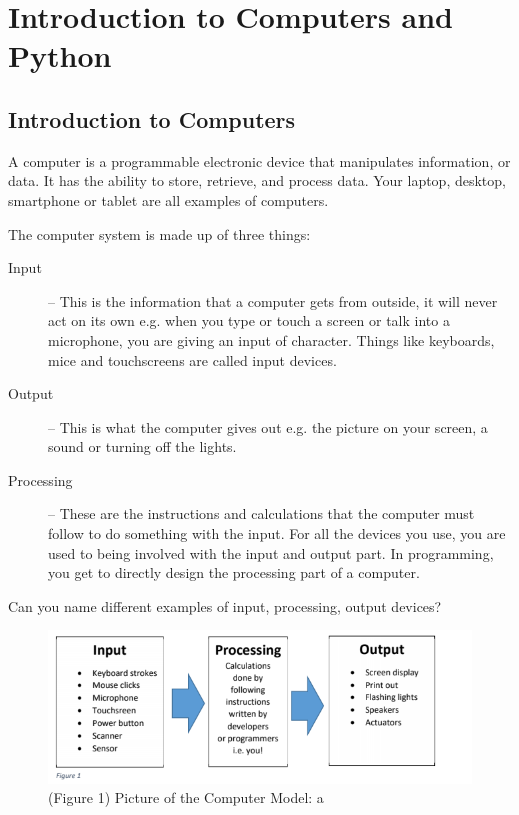 
\chapter{Introduction to Computers and Python}

\section{Introduction to Computers}

A computer is a programmable electronic device that manipulates information, or data. It has the ability to store, retrieve, and process data. Your laptop, desktop, smartphone or tablet are all examples of computers.

\noindent The computer system is made up of three things:
\begin{description}
\item[Input] – This is the information that a computer gets from outside, it will never act on its
own e.g. when you type or touch a screen or talk into a microphone, you are giving an input of character. Things like keyboards, mice and touchscreens are called input devices.\\
\item[Output] – This is what the computer gives out e.g. the picture on your screen, a sound or turning off the lights.\\
\item[Processing] – These are the instructions and calculations that the computer must follow to do something with the input. For all the devices you use, you are used to being 
involved with the input and output part. In programming, you get to directly design
the processing part of a computer.\\
\end{description}

\begin{problem}
Can you name different examples of input, processing, output devices?
\end{problem}

\begin{figure}[h]
\centering\includegraphics[width=\linewidth]{Chapter_One/Figures/a.png}
\caption{(Figure 1) Picture of the Computer Model: {a}}
\label{fig:model} %
\end{figure}

